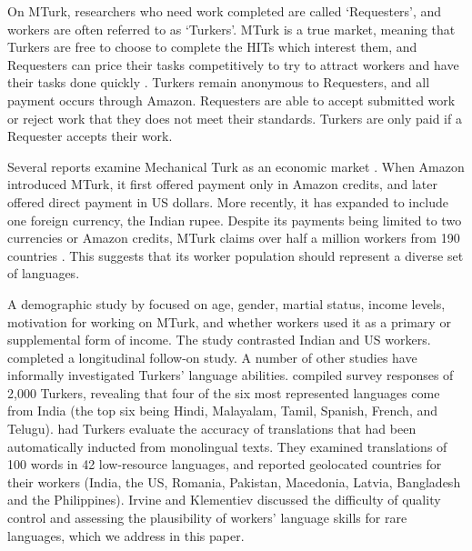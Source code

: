 \documentclass[11pt]{article}
\begin{document}
\nocite{novotney-callisonburch:2010:NAACLHLT}

On MTurk, researchers who need work completed are called `Requesters', and workers are often referred to as `Turkers'.  MTurk is a true market, meaning that Turkers are free to choose to complete the HITs which interest them, and Requesters can price their tasks competitively to try to attract workers and have their tasks done quickly \cite{faridani-et-al:2011,singer-mittal:2011}. Turkers remain anonymous to Requesters, and all payment occurs through Amazon. Requesters are able to accept submitted work or reject work that they does not meet their standards.  Turkers are only paid if a Requester accepts their work. 

Several reports examine Mechanical Turk as an economic market \cite{ipeirotis:2010:marketplace,lehdonvirta-ernkvist:2011}.  When Amazon introduced MTurk, it first offered payment only in Amazon credits, and later offered direct payment in US dollars. More recently, it has expanded to include one foreign currency, the Indian rupee. Despite its payments being limited to two currencies or Amazon credits, MTurk claims over half a million workers from 190 countries \cite{AmazonRequesterTour}.  This suggests that its worker population should represent a diverse set of languages.

A demographic study by  focused on age, gender, martial status, income levels, motivation for working on MTurk, and whether workers used it as a primary or supplemental form of income.  The study contrasted Indian and US workers.  completed a longitudinal follow-on study. 
A number of other studies have informally investigated Turkers' language abilities.   compiled survey responses of 2,000 Turkers, revealing that four of the six most represented languages come from India (the top six being Hindi, Malayalam, Tamil, Spanish, French, and Telugu).   had Turkers evaluate the accuracy of translations that had been automatically inducted from monolingual texts.  They examined translations of 100 words in 42 low-resource languages, and reported geolocated countries for their workers (India, the US, Romania, Pakistan, Macedonia, Latvia, Bangladesh and the Philippines).  Irvine and Klementiev discussed the difficulty of quality control and assessing the plausibility of workers' language skills for rare languages, which we address in this paper. 
\end{document}
